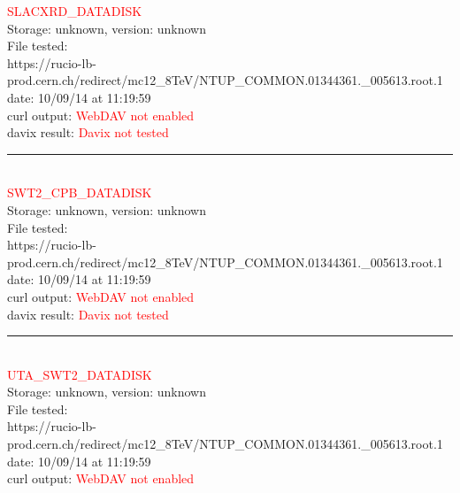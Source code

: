 \textcolor{red}{\normalsize{SLACXRD\_DATADISK}}\\

Storage: unknown, version: unknown\\

File tested:\\
\footnotesize{https://rucio-lb-prod.cern.ch/redirect/mc12\_8TeV/NTUP\_COMMON.01344361.\_005613.root.1}\\

date: 10/09/14 at 11:19:59\\

curl output:  \textcolor{red}{WebDAV not enabled}\\

davix result:  \textcolor{red}{Davix not tested}\\

\rule{\textwidth}{1pt}\\

\textcolor{red}{\normalsize{SWT2\_CPB\_DATADISK}}\\

Storage: unknown, version: unknown\\

File tested:\\
\footnotesize{https://rucio-lb-prod.cern.ch/redirect/mc12\_8TeV/NTUP\_COMMON.01344361.\_005613.root.1}\\

date: 10/09/14 at 11:19:59\\

curl output:  \textcolor{red}{WebDAV not enabled}\\

davix result:  \textcolor{red}{Davix not tested}\\

\rule{\textwidth}{1pt}\\

\textcolor{red}{\normalsize{UTA\_SWT2\_DATADISK}}\\

Storage: unknown, version: unknown\\

File tested:\\
\footnotesize{https://rucio-lb-prod.cern.ch/redirect/mc12\_8TeV/NTUP\_COMMON.01344361.\_005613.root.1}\\

date: 10/09/14 at 11:19:59\\

curl output:  \textcolor{red}{WebDAV not enabled}\\

